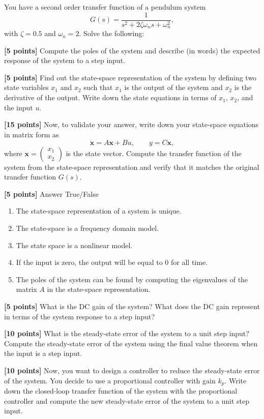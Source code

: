 \documentclass{ee122_pset}
\author{\rule{3cm}{0.4pt}} %
\begin{document}
You have a second order transfer function of a pendulum system
\[
G(s) = \frac{1}{s^2 + 2\zeta \omega_n s + \omega_n^2},
\]
with $\zeta = 0.5$ and $\omega_n = 2$. Solve the following:

\problempart \textbf{[5 points]} Compute the poles of the system and describe (in words) the expected response of the system to a step input.

\problempart \textbf{[5 points]} Find out the state-space representation of the system by defining two state variables $x_1$ and $x_2$ such that $x_1$ is the output of the system and $x_2$ is the derivative of the output. Write down the state equations in terms of $x_1$, $x_2$, and the input $u$.

\problempart \textbf{[15 points]} Now, to validate your answer, write down your state-space equations in matrix form as 
\[
\dot{\textbf{x}} = A\textbf{x} + Bu, \qquad y = C\textbf{x},
\]
where $\textbf{x} = \begin{pmatrix}x_1 \\ x_2\end{pmatrix}$ is the state vector. Compute the transfer function of the system from the state-space representation and verify that it matches the original transfer function $G(s)$.

\problempart \textbf{[5 points]} Answer True/False 
\begin{enumerate}
    \item The state-space representation of a system is unique.
    \item The state-space is a frequency domain model.
    \item The state space is a nonlinear model.
    \item If the input is zero, the output will be equal to 0 for all time.
    \item The poles of the system can be found by computing the eigenvalues of the matrix $A$ in the state-space representation.
\end{enumerate}

\problempart \textbf{[5 points]} What is the DC gain of the system? What does the DC gain represent in terms of the system response to a step input?

\problempart \textbf{[10 points]} What is the steady-state error of the system to a unit step input? Compute the steady-state error of the system using the final value theorem when the input is a step input. 

\problempart \textbf{[10 points]} Now, you want to design a controller to reduce the steady-state error of the system. You decide to use a proportional controller with gain $k_p$. Write down the closed-loop transfer function of the system with the proportional controller and compute the new steady-state error of the system to a unit step input.
\end{document}
